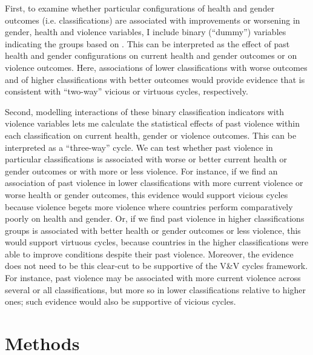 \documentclass[12pt]{article}
\begin{document}
First, to examine whether particular configurations of health and gender outcomes (i.e. classifications) are associated with improvements or worsening in gender, health and violence variables, I include binary (\enquote{dummy}) variables indicating the groups based on . This can be interpreted as the effect of past health and gender configurations on current health and gender outcomes or on violence outcomes. Here, associations of lower classifications with worse outcomes and of higher classifications with better outcomes would provide evidence that is consistent with \enquote{two-way} vicious or virtuous cycles, respectively.

Second, modelling interactions of these binary classification indicators with violence variables lets me calculate the statistical effects of past violence within each classification on current health, gender or violence outcomes. This can be interpreted as a \enquote{three-way} cycle. We can test whether past violence in particular classifications is associated with worse or better current health or gender outcomes or with more or less violence. For instance, if we find an association of past violence in lower classifications with more current violence or worse health or gender outcomes, this evidence would support vicious cycles because violence begets more violence where countries perform comparatively poorly on health and gender. Or, if we find past violence in higher classifications groups is associated with better health or gender outcomes or less violence, this would support virtuous cycles, because countries in the higher classifications were able to improve conditions despite their past violence. Moreover, the evidence does not need to be this clear-cut to be supportive of the V\&V cycles framework. For instance, past violence may be associated with more current violence across several or all classifications, but more so in lower classifications relative to higher ones; such evidence would also be supportive of vicious cycles.

\section{Methods}
\label{methods}
\end{document}
